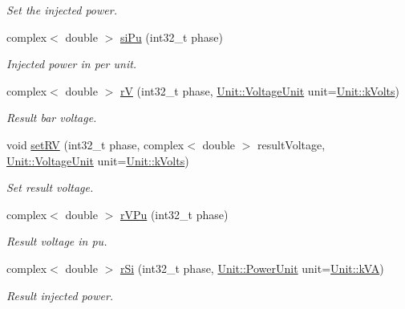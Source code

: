 \begin{DoxyCompactItemize}
\begin{DoxyCompactList}\small\item\em Set the injected power. \end{DoxyCompactList}\item 
complex$<$ double $>$ \hyperlink{group___models_ga8ac94a6b5f69417da962a7d87361b416}{si\+Pu} (int32\+\_\+t phase)
\begin{DoxyCompactList}\small\item\em Injected power in per unit. \end{DoxyCompactList}\item 
complex$<$ double $>$ \hyperlink{group___models_ga2d1f6bfbd8abaf168bb75bd8e5cd9b5e}{r\+V} (int32\+\_\+t phase, \hyperlink{class_unit_a55b07dfa9457e1eca2c7194fe0cfc3c1}{Unit\+::\+Voltage\+Unit} unit=\hyperlink{class_unit_a55b07dfa9457e1eca2c7194fe0cfc3c1aa54b2473993a702a3923525765bd6e4c}{Unit\+::k\+Volts})
\begin{DoxyCompactList}\small\item\em Result bar voltage. \end{DoxyCompactList}\item 
void \hyperlink{group___models_ga2b2c5a373d87025e79d26aa9c4cea75a}{set\+R\+V} (int32\+\_\+t phase, complex$<$ double $>$ result\+Voltage, \hyperlink{class_unit_a55b07dfa9457e1eca2c7194fe0cfc3c1}{Unit\+::\+Voltage\+Unit} unit=\hyperlink{class_unit_a55b07dfa9457e1eca2c7194fe0cfc3c1aa54b2473993a702a3923525765bd6e4c}{Unit\+::k\+Volts})
\begin{DoxyCompactList}\small\item\em Set result voltage. \end{DoxyCompactList}\item 
complex$<$ double $>$ \hyperlink{group___models_ga7deee8820e2ee3e0db993a1e76b68700}{r\+V\+Pu} (int32\+\_\+t phase)
\begin{DoxyCompactList}\small\item\em Result voltage in pu. \end{DoxyCompactList}\item 
complex$<$ double $>$ \hyperlink{group___models_gac8ddd4cb566d995b70b0f83146aa12b3}{r\+Si} (int32\+\_\+t phase, \hyperlink{class_unit_ace265ae255370ccacfd5370337572c3b}{Unit\+::\+Power\+Unit} unit=\hyperlink{class_unit_ace265ae255370ccacfd5370337572c3ba72b181a842ae2759488a2fa1410d3696}{Unit\+::k\+V\+A})
\begin{DoxyCompactList}\small\item\em Result injected power. \end{DoxyCompactList}\item 

\end{DoxyCompactItemize}
